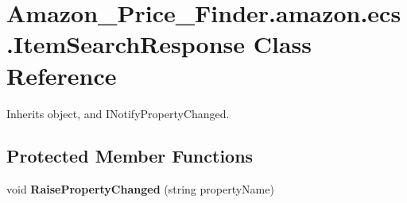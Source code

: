 \hypertarget{class_amazon___price___finder_1_1amazon_1_1ecs_1_1_item_search_response}{\section{Amazon\-\_\-\-Price\-\_\-\-Finder.\-amazon.\-ecs.\-Item\-Search\-Response Class Reference}
\label{class_amazon___price___finder_1_1amazon_1_1ecs_1_1_item_search_response}
}


 




Inherits object, and I\-Notify\-Property\-Changed.

\subsection*{Protected Member Functions}
\begin{DoxyCompactItemize}
\item 
\hypertarget{class_amazon___price___finder_1_1amazon_1_1ecs_1_1_item_search_response_af0598455ba6173a7a74a36eec09249ec}{void {\bfseries Raise\-Property\-Changed} (string property\-Name)}\label{class_amazon___price___finder_1_1amazon_1_1ecs_1_1_item_search_response_af0598455ba6173a7a74a36eec09249ec}

\end{DoxyCompactItemize}
